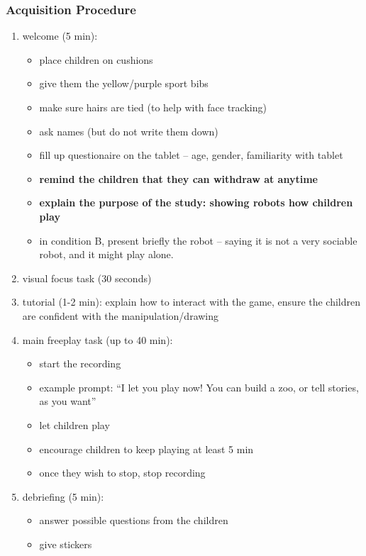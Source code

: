 \documentclass{article}
\begin{document}
\subsubsection{Acquisition Procedure}


\begin{enumerate}
\def\labelenumi{\arabic{enumi}.}
\item
  welcome (5 min):

  \begin{itemize}
  \item
    place children on cushions
  \item
    give them the yellow/purple sport bibs
  \item
    make sure hairs are tied (to help with face tracking)
  \item
    ask names (but do not write them down)
  \item
    fill up questionaire on the tablet -- age, gender, familiarity with
    tablet
  \item
    \textbf{remind the children that they can withdraw at anytime}
  \item
    \textbf{explain the purpose of the study: showing robots how
    children play}
  \item
    in condition B, present briefly the robot -- saying it is not a very
    sociable robot, and it might play alone.
  \end{itemize}
\item
  visual focus task (30 seconds)
\item
  tutorial (1-2 min): explain how to interact with the game, ensure the
  children are confident with the manipulation/drawing
\item
  main freeplay task (up to 40 min):

  \begin{itemize}
  \item
    start the recording
  \item
    example prompt: ``I let you play now! You can build a zoo, or tell
    stories, as you want''
  \item
    let children play
  \item
    encourage children to keep playing at least 5 min
  \item
    once they wish to stop, stop recording
  \end{itemize}
\item
  debriefing (5 min):

  \begin{itemize}
  \item
    answer possible questions from the children
  \item
    give stickers
  \end{itemize}
\end{enumerate}
\end{document}
